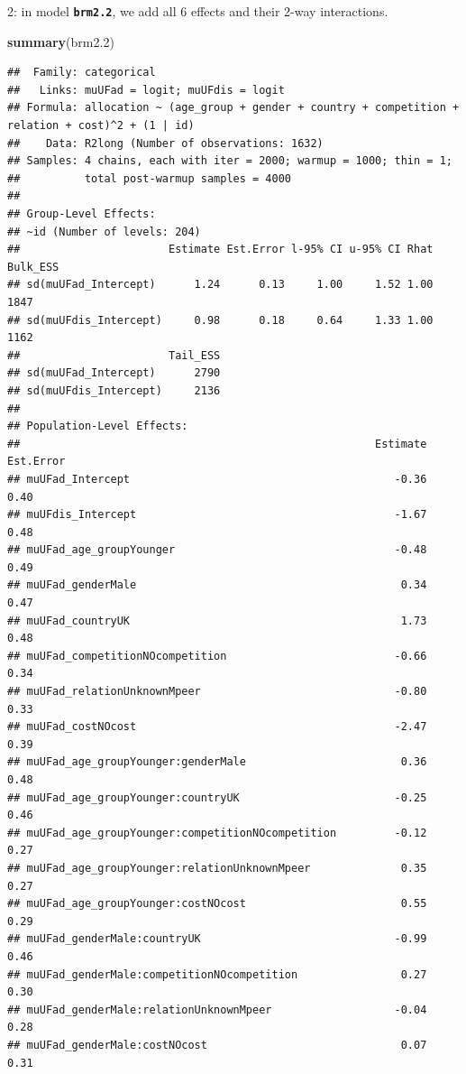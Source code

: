 \documentclass[
]{article}
\newenvironment{Shaded}{\begin{snugshade}}{\end{snugshade}}
\newcommand{\FloatTok}[1]{\textcolor[rgb]{0.00,0.00,0.81}{#1}}
\newcommand{\KeywordTok}[1]{\textcolor[rgb]{0.13,0.29,0.53}{\textbf{#1}}}
\newcommand{\NormalTok}[1]{#1}
\begin{document}
2: in model \textbf{\texttt{brm2.2}}, we add all 6 effects and their
2-way interactions.

\begin{Shaded}
\begin{Highlighting}[]
\KeywordTok{summary}\NormalTok{(brm2}\FloatTok{.2}\NormalTok{)}
\end{Highlighting}
\end{Shaded}

\begin{verbatim}
##  Family: categorical 
##   Links: muUFad = logit; muUFdis = logit 
## Formula: allocation ~ (age_group + gender + country + competition + relation + cost)^2 + (1 | id) 
##    Data: R2long (Number of observations: 1632) 
## Samples: 4 chains, each with iter = 2000; warmup = 1000; thin = 1;
##          total post-warmup samples = 4000
## 
## Group-Level Effects: 
## ~id (Number of levels: 204) 
##                       Estimate Est.Error l-95% CI u-95% CI Rhat Bulk_ESS
## sd(muUFad_Intercept)      1.24      0.13     1.00     1.52 1.00     1847
## sd(muUFdis_Intercept)     0.98      0.18     0.64     1.33 1.00     1162
##                       Tail_ESS
## sd(muUFad_Intercept)      2790
## sd(muUFdis_Intercept)     2136
## 
## Population-Level Effects: 
##                                                       Estimate Est.Error
## muUFad_Intercept                                         -0.36      0.40
## muUFdis_Intercept                                        -1.67      0.48
## muUFad_age_groupYounger                                  -0.48      0.49
## muUFad_genderMale                                         0.34      0.47
## muUFad_countryUK                                          1.73      0.48
## muUFad_competitionNOcompetition                          -0.66      0.34
## muUFad_relationUnknownMpeer                              -0.80      0.33
## muUFad_costNOcost                                        -2.47      0.39
## muUFad_age_groupYounger:genderMale                        0.36      0.48
## muUFad_age_groupYounger:countryUK                        -0.25      0.46
## muUFad_age_groupYounger:competitionNOcompetition         -0.12      0.27
## muUFad_age_groupYounger:relationUnknownMpeer              0.35      0.27
## muUFad_age_groupYounger:costNOcost                        0.55      0.29
## muUFad_genderMale:countryUK                              -0.99      0.46
## muUFad_genderMale:competitionNOcompetition                0.27      0.30
## muUFad_genderMale:relationUnknownMpeer                   -0.04      0.28
## muUFad_genderMale:costNOcost                              0.07      0.31

\end{verbatim}
\end{document}
